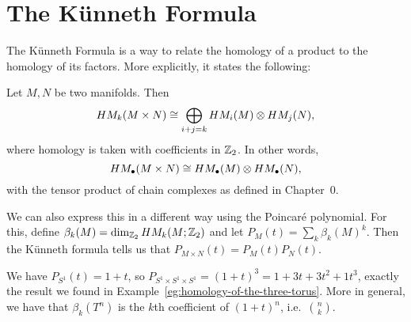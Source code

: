 \section{The Künneth Formula}
The Künneth Formula is a way to relate the homology of a product to the homology of its factors. More explicitly, it states the following:
\begin{prop}
    Let $M, N$ be two manifolds. Then
    \[
        \HMf[k]{M \times N} \cong
        \bigoplus_{i+j  = k} \HMf[i]{M} \otimes \HMf[j]{N}
    ,\]
where homology is taken with coefficients in $ \Z_2$.
In other words,
\[
    \HMf[\bul]{M \times N} \cong \HMf[\bul]{M} \otimes \HMf[\bul] N
,\] 
with the tensor product of chain complexes as defined in Chapter~0.
\end{prop}
We can also express this in a different way using the Poincaré polynomial.
For this, define $\beta_k(M) = \dim_{\Z_2} \HMf[k]{M;\Z_2}$ and let $P_M(t) = \sum_k \beta_k(M) ^{k}$.
Then the Künneth formula tells us that $P_{M \times N}(t) = P_M(t) P_N(t)$.
\begin{eg}
    We have $P_{S^{1}}(t) = 1 + t$, so $P_{S^{1}\times S^{1}\times S^{1}} = (1 + t)^3 = 1 + 3t + 3t^2 + 1t^3$, exactly the result we found in Example~\ref{eg:homology-of-the-three-torus}.
    More in general, we have that $\beta_k(T^{n})$ is the $k$th coefficient of $(1+t)^{n}$, i.e.\ $\binom{n}{k}$.
\end{eg}
